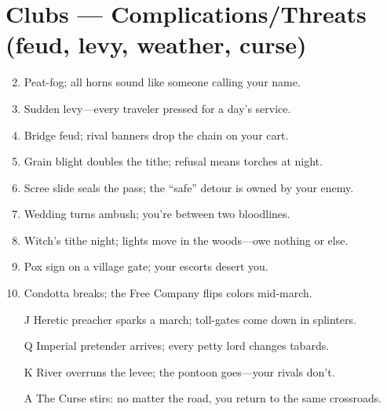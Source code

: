 \section*{Clubs --- Complications/Threats (feud, levy, weather, curse)}
\label{sec:acasia-complications}
\begin{enumerate}
\setcounter{enumi}{1}
\item Peat-fog; all horns sound like someone calling your name.
\item Sudden levy---every traveler pressed for a day's service.
\item Bridge feud; rival banners drop the chain on your cart.
\item Grain blight doubles the tithe; refusal means torches at night.
\item Scree slide seals the pass; the ``safe'' detour is owned by your enemy.
\item Wedding turns ambush; you're between two bloodlines.
\item Witch's tithe night; lights move in the woods---owe nothing or else.
\item Pox sign on a village gate; your escorts desert you.
\item Condotta breaks; the Free Company flips colors mid-march.
\item[J] Heretic preacher sparks a march; toll-gates come down in splinters.
\item[Q] Imperial pretender arrives; every petty lord changes tabards.
\item[K] River overruns the levee; the pontoon goes---your rivals don't.
\item[A] The Curse stirs: no matter the road, you return to the same crossroads.
\end{enumerate}

